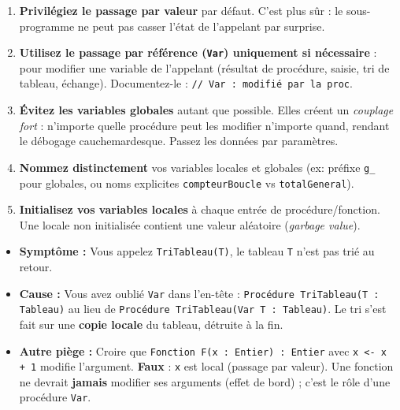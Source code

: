 \documentclass[11pt]{article}
\begin{document}
\begin{methode}
\begin{enumerate}
    \item \textbf{Privilégiez le passage par valeur} par défaut. C'est plus sûr : le sous-programme ne peut pas casser l'état de l'appelant par surprise.
    \item \textbf{Utilisez le passage par référence (\texttt{Var}) uniquement si nécessaire} : pour modifier une variable de l'appelant (résultat de procédure, saisie, tri de tableau, échange). Documentez-le : \texttt{// Var : modifié par la proc}.
    \item \textbf{Évitez les variables globales} autant que possible. Elles créent un \emph{couplage fort} : n'importe quelle procédure peut les modifier n'importe quand, rendant le débogage cauchemardesque. Passez les données par paramètres.
    \item \textbf{Nommez distinctement} vos variables locales et globales (ex: préfixe \texttt{g\_} pour globales, ou noms explicites \texttt{compteurBoucle} vs \texttt{totalGeneral}).
    \item \textbf{Initialisez vos variables locales} à chaque entrée de procédure/fonction. Une locale non initialisée contient une valeur aléatoire (\emph{garbage value}).
\end{enumerate}
\end{methode}

\begin{attention}
\begin{itemize}
    \item \textbf{Symptôme :} Vous appelez \texttt{TriTableau(T)}, le tableau \texttt{T} n'est pas trié au retour.
    \item \textbf{Cause :} Vous avez oublié \texttt{Var} dans l'en-tête : \texttt{Procédure TriTableau(T : Tableau)} au lieu de \texttt{Procédure TriTableau(Var T : Tableau)}. Le tri s'est fait sur une \textbf{copie locale} du tableau, détruite à la fin.
    \item \textbf{Autre piège :} Croire que \texttt{Fonction F(x : Entier) : Entier} avec \texttt{x <- x + 1} modifie l'argument. \textbf{Faux} : \texttt{x} est local (passage par valeur). Une fonction ne devrait \textbf{jamais} modifier ses arguments (effet de bord) ; c'est le rôle d'une procédure \texttt{Var}.
\end{itemize}
\end{attention}
\end{document}
